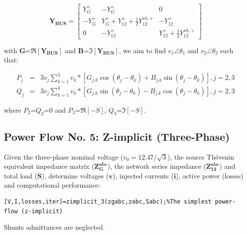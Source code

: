\documentclass[12pt]{article}
\begin{document}
\begin{equation}\mathbf{Y_{BUS}}=
  \left[ \begin{array}{ccc}\label{1}
 {Y}^{+}_{G} & - {Y}^{+}_{G}  &0 \\
 - {Y}^{+}_{G} &  {Y}^{+}_{G}+{Y}^{+}_{12}+\frac{1}{2}{Y}^{sh,+}_{12} & -{Y}^{+}_{12}\\
 0 & -{Y}^{+}_{12} & {Y}^{+}_{12}+\frac{1}{2}{Y}^{sh,+}_{12}
             \end{array}           \right]
 \end{equation}

with $\mathbf{G}$=$\Re [\mathbf{Y_{BUS}}]$ and $\mathbf{B}$=$\Im [\mathbf{Y_{BUS}}]$, we aim to find   ${v}_1\angle \theta_1$ and  ${v}_2\angle \theta_2$ such that:
 
\begin{eqnarray}\label{2}
  P_j&=&3v_j \sum_{k=1}^3 v_k*[G_{j.k}\cos(\theta_j-\theta_k)+B_{j.k}\sin(\theta_j-\theta_k)], j=2,3\\\label{3}
    Q_j&=&3v_j \sum_{k=1}^3 v_k*[G_{j.k}\sin(\theta_j-\theta_k)-B_{j.k}\cos(\theta_j-\theta_k)], j=2,3
\end{eqnarray}

where $P_2$=$Q_2$=0 and  $P_3$=$\Re [-{S}]$, $Q_3$=$\Im [-{S}]$. 

\subsection{Power Flow No. 5: Z-implicit (Three-Phase)}

Given the three-phase nominal voltage ($v_0=12.47/\sqrt{3}$), the source Th\'evenin equivalent impedance matrix ($\mathbf{{Z}^{abc}_{G}}$), the network series impedance ($\mathbf{{Z}^{abc}_{12}}$) and total load ($\bm{S}$),
determine voltages ($\bm{v}$), injected currents ($\mathbf{i}$), active power (losses) and computational performance:
    
\begin{verbatim}
[V,I,losses,iter]=zimplicit_3(zgabc,zabc,Sabc);%The simplest power-flow (z-implicit) 
\end{verbatim}

Shunts admittances are neglected.

\begin{figure}[hbt]
\end{figure}
\newpage
\end{document}
